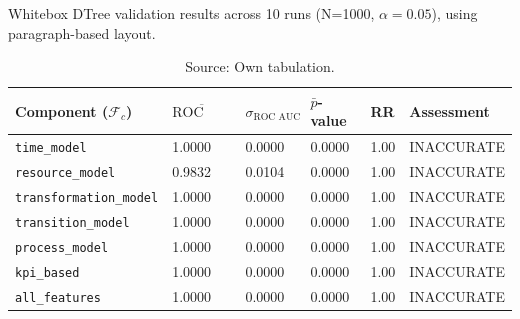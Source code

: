 \begin{table}[htbp]
  \centering
  \caption[Whitebox model results]{Whitebox DTree validation results across 10 runs (N=1000, $\alpha=0.05$), using paragraph-based layout.}
  \label{tab:results-whitebox}
  \begin{tabular}{l l l l l p{3cm}}
    \toprule
    \textbf{Component ($\mathcal{F}_c$)} & \textbf{$\overline{\text{ROC AUC}}$} & \textbf{$\sigma_{\text{ROC AUC}}$} & \textbf{$\bar{p}$-value} & \textbf{RR} & \textbf{Assessment} \\
    \midrule
    \texttt{time\_model}                 & 1.0000                               & 0.0000                             & 0.0000                   & 1.00        & INACCURATE          \\
    \texttt{resource\_model}             & 0.9832                               & 0.0104                             & 0.0000                   & 1.00        & INACCURATE          \\
    \texttt{transformation\_model}       & 1.0000                               & 0.0000                             & 0.0000                   & 1.00        & INACCURATE          \\
    \texttt{transition\_model}           & 1.0000                               & 0.0000                             & 0.0000                   & 1.00        & INACCURATE          \\
    \texttt{process\_model}              & 1.0000                               & 0.0000                             & 0.0000                   & 1.00        & INACCURATE          \\
    \texttt{kpi\_based}                  & 1.0000                               & 0.0000                             & 0.0000                   & 1.00        & INACCURATE          \\
    \texttt{all\_features}               & 1.0000                               & 0.0000                             & 0.0000                   & 1.00        & INACCURATE          \\
    \bottomrule
  \end{tabular}
  \caption*{Source: Own tabulation.}
\end{table}


